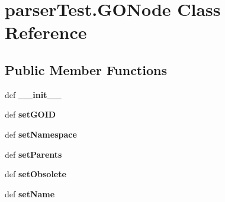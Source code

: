 \hypertarget{classparser_test_1_1_g_o_node}{
\section{parserTest.GONode Class Reference}
\label{classparser_test_1_1_g_o_node}
}
\subsection*{Public Member Functions}
\begin{DoxyCompactItemize}
\item 
\hypertarget{classparser_test_1_1_g_o_node_a337b2ac3ab1d03eebc3ec34452bcd23a}{
def {\bfseries \_\-\_\-init\_\-\_\-}}
\label{classparser_test_1_1_g_o_node_a337b2ac3ab1d03eebc3ec34452bcd23a}

\item 
\hypertarget{classparser_test_1_1_g_o_node_a36a1f052f47036c9b9cfed0101fe2838}{
def {\bfseries setGOID}}
\label{classparser_test_1_1_g_o_node_a36a1f052f47036c9b9cfed0101fe2838}

\item 
\hypertarget{classparser_test_1_1_g_o_node_acaad9138f0984a66abd44ea7dbd68547}{
def {\bfseries setNamespace}}
\label{classparser_test_1_1_g_o_node_acaad9138f0984a66abd44ea7dbd68547}

\item 
\hypertarget{classparser_test_1_1_g_o_node_a73121d70ad2f7ebe1b63b69daafa4bb4}{
def {\bfseries setParents}}
\label{classparser_test_1_1_g_o_node_a73121d70ad2f7ebe1b63b69daafa4bb4}

\item 
\hypertarget{classparser_test_1_1_g_o_node_a9fe7f6476219873ffbf43deb035ae3e6}{
def {\bfseries setObsolete}}
\label{classparser_test_1_1_g_o_node_a9fe7f6476219873ffbf43deb035ae3e6}

\item 
\hypertarget{classparser_test_1_1_g_o_node_a1b22eee3d4957133775d0629861a74b2}{
def {\bfseries setName}}
\label{classparser_test_1_1_g_o_node_a1b22eee3d4957133775d0629861a74b2}

\end{DoxyCompactItemize}
